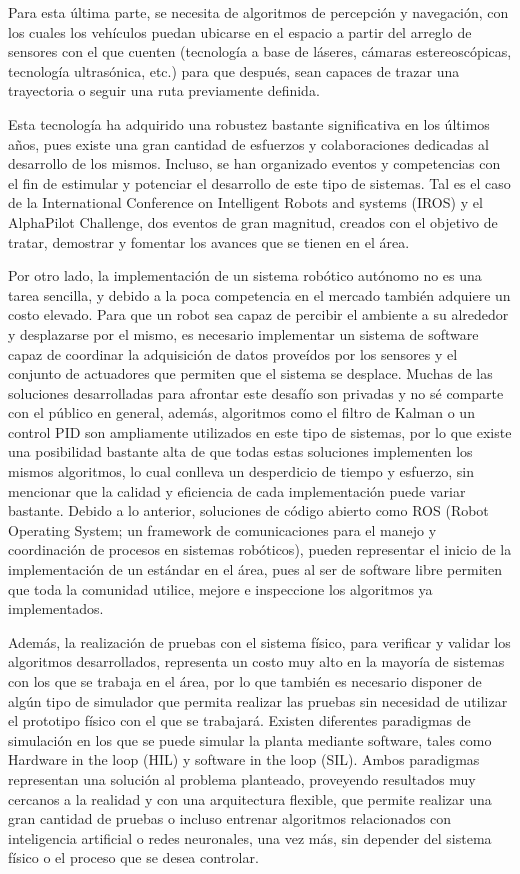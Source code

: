 Para esta última parte, se necesita de algoritmos de percepción y navegación, con los cuales los vehículos puedan ubicarse en el espacio a partir del arreglo de sensores con el que cuenten (tecnología a base de láseres, cámaras estereoscópicas, tecnología ultrasónica, etc.) para que después, sean capaces de trazar una trayectoria o seguir una ruta previamente definida.   

Esta tecnología ha adquirido una robustez bastante significativa en los últimos años, pues existe una gran cantidad de esfuerzos y colaboraciones dedicadas al desarrollo de los mismos. Incluso, se han organizado eventos y competencias con el fin de estimular y potenciar el desarrollo de este tipo de sistemas. Tal es el caso de la International Conference on Intelligent Robots and systems (IROS) y el AlphaPilot Challenge, dos eventos de gran magnitud, creados con el objetivo de tratar, demostrar y fomentar los avances que se tienen en el área.

Por otro lado, la implementación de un sistema robótico autónomo no es una tarea sencilla, y debido a la poca competencia en el mercado también adquiere un costo elevado. 
Para que un robot sea capaz de percibir el ambiente a su alrededor y desplazarse por el mismo, es necesario implementar un sistema de software capaz de coordinar la adquisición de datos proveídos por los sensores y el conjunto de actuadores que permiten que el sistema se desplace. Muchas de las soluciones desarrolladas para afrontar este desafío son privadas y no sé comparte con el público en general, además, algoritmos como el filtro de Kalman o un control PID son ampliamente utilizados en este tipo de sistemas, por lo que existe una posibilidad bastante alta de que todas estas soluciones implementen los mismos algoritmos, lo cual conlleva un desperdicio de tiempo y esfuerzo, sin mencionar que la calidad y eficiencia de cada implementación puede variar bastante.
Debido a lo anterior, soluciones de código abierto como ROS (Robot Operating System; un framework de comunicaciones para el manejo y coordinación de procesos en sistemas robóticos), pueden representar el inicio de la implementación de un estándar en el área, pues al ser de software libre permiten que toda la comunidad utilice, mejore e inspeccione los algoritmos ya implementados.

Además, la realización de pruebas con el sistema físico, para verificar y validar los algoritmos desarrollados, representa un costo muy alto en la mayoría de sistemas con los que se trabaja en el área, por lo que también es necesario disponer de algún tipo de simulador que permita realizar las pruebas sin necesidad de utilizar el prototipo físico con el que se trabajará. Existen diferentes paradigmas de simulación en los que se puede simular la planta mediante software, tales como Hardware in the loop (HIL) y software in the loop (SIL). Ambos paradigmas representan una solución al problema planteado, proveyendo resultados muy cercanos a la realidad y con una arquitectura flexible, que permite realizar una gran cantidad de pruebas o incluso entrenar algoritmos relacionados con inteligencia artificial o redes neuronales, una vez más, sin depender del sistema físico o el proceso que se desea controlar. 

